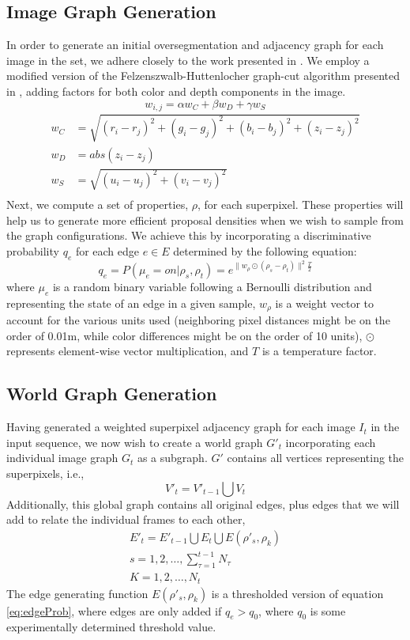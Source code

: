 \documentclass[10pt,letterpaper]{article}
\begin{document}
\subsection{Image Graph Generation}
	In order to generate an initial oversegmentation and adjacency graph for each image in the set, we adhere closely to the work presented in \cite{Erdogan12crv}. We employ a modified version of the Felzenszwalb-Huttenlocher graph-cut algorithm presented in \cite{felzenszwalb2004efficient}, adding factors for both color and depth components in the image.
\begin{equation}
w_{i,j}=\alpha w_C + \beta w_D + \gamma w_S
\end{equation}
\begin{align*}
w_C&=\sqrt{(r_i-r_j)^2+(g_i-g_j)^2+(b_i-b_j)^2+(z_i-z_j)^2} \\
w_D&=abs(z_i-z_j) \\
w_S&=\sqrt{(u_i-u_j)^2+(v_i-v_j)^2} \\
\end{align*}
	Next, we compute a set of properties, $\rho$, for each superpixel. These properties will help us to generate more efficient proposal densities when we wish to sample from the graph configurations. We achieve this by incorporating a discriminative probability $q_e$ for each edge $e\in{E}$ determined by the following equation:
\begin{equation}
	q_e=P(\mu_e=on|\rho_s,\rho_t)=e^{\|w_\rho\odot(\rho_s-\rho_t)\|^2\frac{T}{2}}
	\label{eq:edgeProb}
\end{equation}
where $\mu_e$ is a random binary variable following a Bernoulli distribution and representing the state of an edge in a given sample, $w_\rho$ is a weight vector to account for the various units used (neighboring pixel distances might be on the order of 0.01m, while color differences might be on the order of 10 units), $\odot$ represents element-wise vector multiplication, and $T$ is a temperature factor.

\subsection{World Graph Generation}
	Having generated a weighted superpixel adjacency graph for each image $I_t$ in the input sequence, we now wish to create a world graph $G'_t$ incorporating each individual image graph $G_t$ as a subgraph. $G'$ contains all vertices representing the superpixels, i.e.,
\begin{equation}
	V'_t=V'_{t-1}{\bigcup}V_t
\end{equation}
	 Additionally, this global graph contains all original edges, plus edges that we will add to relate the individual frames to each other,
\begin{eqnarray}
	 E'_t=E'_{t-1}{\bigcup}E_t{\bigcup}E(\rho'_s,\rho_k) \\
s=1,2,\ldots,\sum_{\tau=1}^{t-1}{N_\tau}\nonumber \\
K=1,2,\ldots,N_t\nonumber
\end{eqnarray}	 
	The edge generating function $E(\rho'_s,\rho_k)$ is a thresholded version of equation \ref{eq:edgeProb}, where edges are only added if $q_e>q_0$, where $q_0$ is some experimentally determined threshold value.
	
\end{document}
